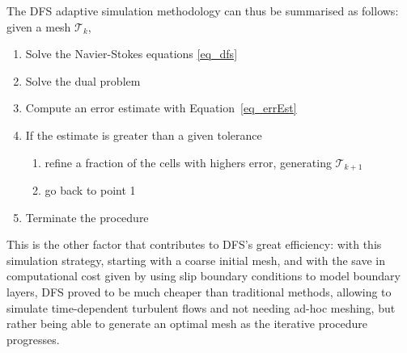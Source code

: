 The DFS adaptive simulation methodology can thus be summarised as follows: given a mesh \(\mathcal{T}_k\),
\begin{enumerate}
  \item Solve the Navier-Stokes equations \eqref{eq_dfs}
  \item Solve the dual problem
  \item Compute an error estimate with Equation~\eqref{eq_errEst}
  \item If the estimate is greater than a given tolerance
    \begin{enumerate}
      \item refine a fraction of the cells with highers error, generating \(\mathcal{T}_{k+1}\)
      \item go back to point 1
    \end{enumerate}
  \item Terminate the procedure
\end{enumerate}

This is the other factor that contributes to DFS's great efficiency: with this simulation strategy, starting with a coarse initial mesh, and with the save in computational cost given by using slip boundary conditions to model boundary layers, DFS proved to be much cheaper than traditional methods, allowing to simulate time-dependent turbulent flows and not needing ad-hoc meshing, but rather being able to generate an optimal mesh as the iterative procedure progresses.
